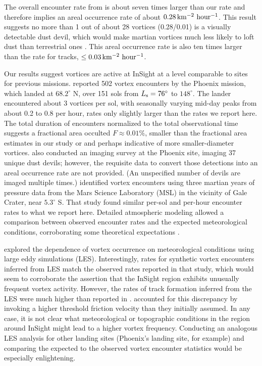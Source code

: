 \documentclass[linenumbers,trackchanges]{aastex63}
\begin{document}
The overall encounter rate from \citet{2021JGRE..12606511S} is about seven times larger than our rate and therefore implies an areal occurrence rate of about $0.28\,{\rm km^{-2}\ hour^{-1}}$. This result suggests no more than 1 out of about 28 vortices (0.28/0.01) is a visually detectable dust devil, which would make martian vortices much less likely to loft dust than terrestrial ones \citep{LORENZ20151}. This areal occurrence rate is also ten times larger than the rate for tracks, $\le 0.03\,{\rm km^{-2}\ hour^{-1}}$.

Our results suggest vortices are active at InSight at a level comparable to sites for previous missions. \citet{2010JGRE..115.0E16E} reported 502 vortex encounters by the Phoenix mission, which landed at $68.2^\circ$ N, over 151 sols from $L_{\rm s} = 76^\circ$ to $148^\circ$. The lander encountered about 3 vortices per sol, with seasonally varying mid-day peaks from about 0.2 to 0.8 per hour, rates only slightly larger than the rates we report here. The total duration of encounters normalized to the total observational time suggests a fractional area occulted $F \approx 0.01\%$, smaller than the fractional area estimates in our study or \citet{2021Icar..35514119L} and perhaps indicative of more smaller-diameter vortices. \citet{2010JGRE..115.0E16E} also conducted an imaging survey at the Phoenix site, imaging 37 unique dust devils; however, the requisite data to convert those detections into an areal occurrence rate are not provided. (An unspecified number of devils are imaged multiple times.) \citet{2019JGRE..124.3442N} identified vortex encounters using three martian years of pressure data from the Mars Science Laboratory (MSL) in the vicinity of Gale Crater, near $5.3^\circ$ S. That study found similar per-sol and per-hour encounter rates to what we report here. Detailed atmospheric modeling allowed a comparison between observed encounter rates and the expected meteorological conditions, corroborating some theoretical expectations \citep{1998JAtS...55.3244R}.

\citet{2021JGRE..12606511S} explored the dependence of vortex occurrence on meteorological conditions using large eddy simulations (LES). Interestingly, rates for synthetic vortex encounters inferred from LES match the observed rates reported in that study, which would seem to corroborate the assertion that the InSight region exhibits unusually frequent vortex activity. However, the rates of track formation inferred from the LES were much higher than reported in \citet{2020GeoRL..4787234P}. \citet{2021JGRE..12606511S} accounted for this discrepancy by invoking a higher threshold friction velocity than they initially assumed. In any case, it is not clear what meteorological or topographic conditions in the region around InSight might lead to a higher vortex frequency. Conducting an analogous LES analysis for other landing sites (Phoenix's landing site, for example) and comparing the expected to the observed vortex encounter statistics would be especially enlightening. 
\end{document}
